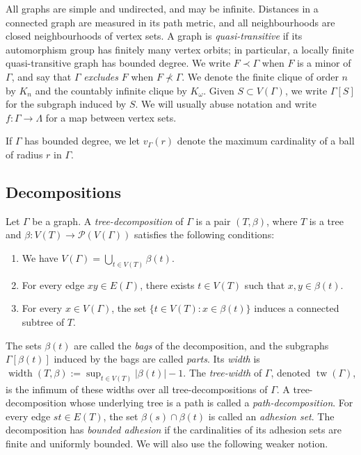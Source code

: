 \documentclass[10pt,a4paper]{amsart}
\theoremstyle{definition}
\begin{document}
All graphs are simple and undirected, and may be infinite.
Distances in a connected graph are measured in its path metric, and all neighbourhoods are closed neighbourhoods of vertex sets.
A graph is \emph{quasi-transitive} if its automorphism group has finitely many vertex orbits; in particular, a locally finite quasi-transitive graph has bounded degree.
We write $F\prec\Gamma$ when $F$ is a minor of $\Gamma$, and say that $\Gamma$ \emph{excludes} $F$ when $F\nprec\Gamma$.
We denote the finite clique of order $n$ by $K_n$ and the countably infinite clique by $K_\omega$. Given $S \subset V(\Gamma)$, we write $\Gamma[S]$ for the subgraph induced by $S$. We will usually abuse notation and write $f:\Gamma\to\Lambda$ for a map between vertex sets.

If $\Gamma$ has bounded degree, we let $v_\Gamma(r)$ denote the maximum cardinality of a ball of radius $r$ in $\Gamma$.

\subsection{Decompositions}\label{subsec:decompositions}


Let $\Gamma$ be a graph.
A \emph{tree-decomposition} of $\Gamma$ is a pair $(T,\beta)$, where $T$ is a tree and $\beta:V(T)\to\mathcal{P}(V(\Gamma))$ satisfies the following conditions:
\begin{enumerate}
\item[(T1)] We have $V(\Gamma)=\bigcup_{t\in V(T)}\beta(t)$.
\item[(T2)] For every edge $xy\in E(\Gamma)$, there exists $t\in V(T)$ such that $x,y\in\beta(t)$.
\item[(T3)] For every $x\in V(\Gamma)$, the set $\{t\in V(T):x\in\beta(t)\}$ induces a connected subtree of $T$.
\end{enumerate}
The sets $\beta(t)$ are called the \emph{bags} of the decomposition, and the subgraphs $\Gamma[\beta(t)]$ induced by the bags are called \emph{parts}.
Its \emph{width} is $\operatorname{width}(T,\beta):=\sup_{t\in V(T)}|\beta(t)|-1$.
The \emph{tree-width} of $\Gamma$, denoted $\operatorname{tw}(\Gamma)$, is the infimum of these widths over all tree-decompositions of $\Gamma$.
A tree-decomposition whose underlying tree is a path is called a \emph{path-decomposition}.
For every edge $st\in E(T)$, the set $\beta(s)\cap\beta(t)$ is called an \emph{adhesion set}.
The decomposition has \emph{bounded adhesion} if the cardinalities of its adhesion sets are finite and uniformly bounded.
We will also use the following weaker notion.
\end{document}

